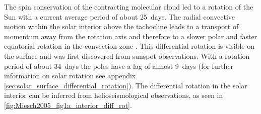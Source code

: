 The spin conservation of the contracting molecular cloud led to a rotation of the Sun with a current average period of about 25~days. The radial convective motion within the solar interior above the tachocline leads to a transport of momentum away from the rotation axis and therefore to a slower polar and faster equatorial rotation in the convection zone \citep{Miesch2005}. This differential rotation is visible on the surface and was first discovered from sunspot observations. %
With a rotation period of about 34~days the poles have a lag of almost 9~days (for further information on solar rotation see appendix \autoref{sec:solar_surface_differential_rotation}). The differential rotation in the solar interior can be inferred from helioseismological observations, as seen in \autoref{fig:Miesch2005_fig1a_interior_diff_rot}.\\

